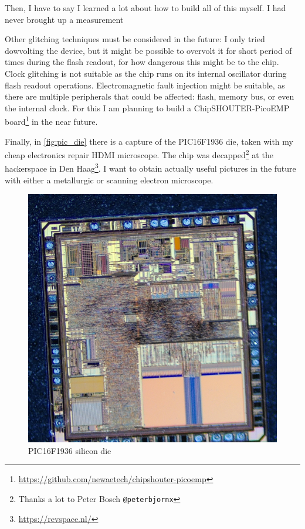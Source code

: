\documentclass[a4paper,english,twoside,10pt]{article}
\begin{document}
Then, I have to say I learned a lot about how to build all of this myself. I had never brought up a measurement

Other glitching techniques must be considered in the future: I only tried dowvolting the device, but it might be possible to overvolt it for short period of times during the flash readout, for how dangerous this might be to the chip. Clock glitching is not suitable as the chip runs on its internal oscillator during flash readout operations. Electromagnetic fault injection might be suitable, as there are multiple peripherals that could be affected: flash, memory bus, or even the internal clock. For this I am planning to build a ChipSHOUTER-PicoEMP board\footnote{\url{https://github.com/newaetech/chipshouter-picoemp}} in the near future.

Finally, in \autoref{fig:pic_die} there is a capture of the PIC16F1936 die, taken with my cheap electronics repair HDMI microscope. The chip was decapped\footnote{Thanks a lot to Peter Bosch \texttt{@peterbjornx}} at the hackerspace in Den Haag\footnote{\url{https://revspace.nl/}}. I want to obtain actually useful pictures in the future with either a metallurgic or scanning electron microscope.

\begin{figure}[htbp]
	\centering%
	\includegraphics[width=.75\textwidth]{pic_die_HDMI_microscope.jpg}
	\caption{PIC16F1936 silicon die}
	\label{fig:pic_die}
\end{figure}


\clearpage%
\printglossary[type=\acronymtype]%
\printglossary%
{
\raggedright%


}
\end{document}
